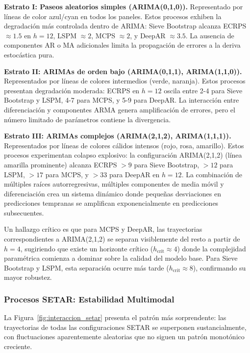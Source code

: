 \textbf{Estrato I: Paseos aleatorios simples (ARIMA(0,1,0)).} Representado por líneas de color azul/cyan en todos los paneles. Estos procesos exhiben la degradación más controlada dentro de ARIMA: Sieve Bootstrap alcanza ECRPS $\approx 1.5$ en $h=12$, LSPM $\approx 2$, MCPS $\approx 2$, y DeepAR $\approx 3.5$. La ausencia de componentes AR o MA adicionales limita la propagación de errores a la deriva estocástica pura.

\textbf{Estrato II: ARIMAs de orden bajo (ARIMA(0,1,1), ARIMA(1,1,0)).} Representados por líneas de colores intermedios (verde, naranja). Estos procesos presentan degradación moderada: ECRPS en $h=12$ oscila entre 2-4 para Sieve Bootstrap y LSPM, 4-7 para MCPS, y 5-9 para DeepAR. La interacción entre diferenciación y componentes ARMA genera amplificación de errores, pero el número limitado de parámetros contiene la divergencia.

\textbf{Estrato III: ARIMAs complejos (ARIMA(2,1,2), ARIMA(1,1,1)).} Representados por líneas de colores cálidos intensos (rojo, rosa, amarillo). Estos procesos experimentan colapso explosivo: la configuración ARIMA(2,1,2) (línea amarilla prominente) alcanza ECRPS $> 9$ para Sieve Bootstrap, $> 12$ para LSPM, $> 17$ para MCPS, y $> 33$ para DeepAR en $h=12$. La combinación de múltiples raíces autorregresivas, múltiples componentes de media móvil y diferenciación crea un sistema dinámico donde pequeñas desviaciones en predicciones tempranas se amplifican exponencialmente en predicciones subsecuentes.

Un hallazgo crítico es que para MCPS y DeepAR, las trayectorias correspondientes a ARIMA(2,1,2) se separan visiblemente del resto a partir de $h=4$, sugiriendo que existe un horizonte crítico ($h_{\text{crit}} \approx 4$) donde la complejidad paramétrica comienza a dominar sobre la calidad del modelo base. Para Sieve Bootstrap y LSPM, esta separación ocurre más tarde ($h_{\text{crit}} \approx 8$), confirmando su mayor robustez.

\subsubsection{Procesos SETAR: Estabilidad Multimodal}

La Figura~\ref{fig:interaccion_setar} presenta el patrón más sorprendente: las trayectorias de todas las configuraciones SETAR se superponen sustancialmente, con fluctuaciones aparentemente aleatorias que no siguen un patrón monotónico creciente.

